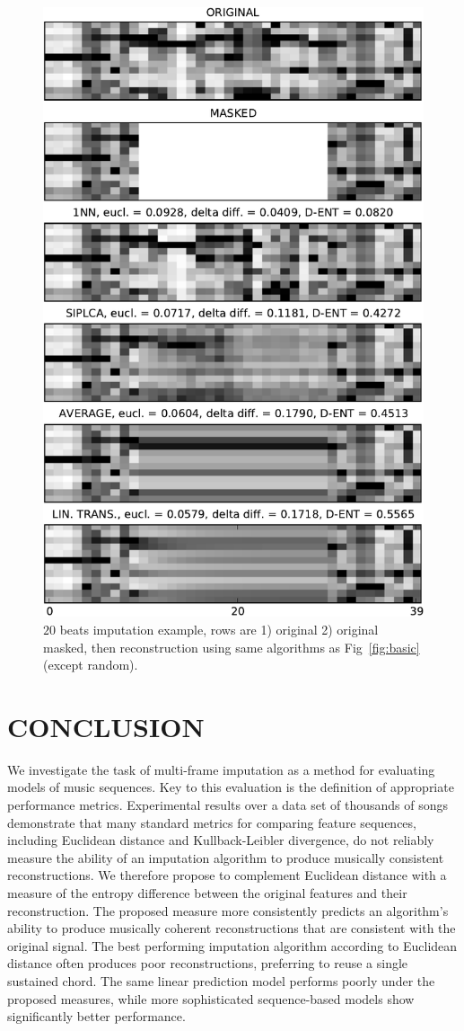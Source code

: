 \documentclass{article}
\begin{document}
\begin{figure}[t]
\begin{center}
\includegraphics[width=.75\columnwidth]{basic3}
\end{center}
\caption{$20$ beats imputation example, rows are 1) original 2) original masked,
then reconstruction using same algorithms as Fig~\ref{fig:basic} (except random).
\label{fig:basic3}}
\end{figure}

\section{CONCLUSION} %
\label{sec:conclusion}

We investigate the task of multi-frame imputation as a method for
evaluating models of music sequences.  
%
Key to this evaluation is the definition of appropriate performance
metrics.  
%
Experimental results over a data set of thousands of songs demonstrate
that many standard metrics for comparing feature sequences, including
Euclidean distance and Kullback-Leibler divergence, do not reliably
measure the ability of an imputation algorithm to produce musically
consistent reconstructions.  We therefore propose to complement
Euclidean distance with a measure of the entropy difference between
the original features and their reconstruction.
%
The proposed measure more consistently predicts an algorithm's ability
to produce musically coherent reconstructions that are consistent with
the original signal.
%
The best performing imputation algorithm according to Euclidean
distance often produces poor reconstructions, preferring to reuse a
single sustained chord.  The same linear prediction model performs
poorly under the proposed measures, while more sophisticated
sequence-based models show significantly better performance. 
\end{document}
